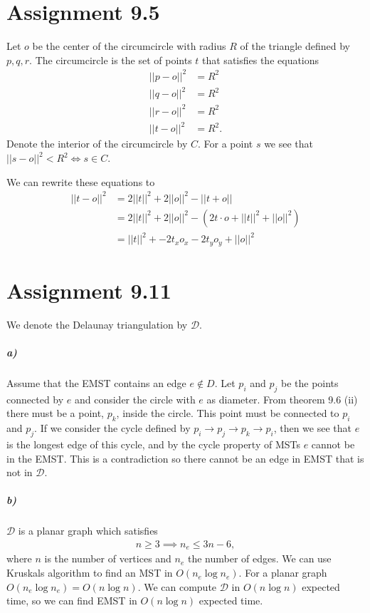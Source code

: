 \documentclass[10pt,a4paper,final,oneside,openany,article,oldfontcommands]{memoir}
\newcommand{\D}{\mathcal{D}}
\begin{document}
\chapter*{Assignment 9.5}
Let $o$ be the center of the circumcircle with radius $R$ of the triangle
defined by $p, q, r$. The circumcircle is the set of points $t$ that satisfies
the equations
\begin{align*}
  ||p - o||^2 &= R^2\\
  ||q - o||^2 &= R^2\\
  ||r - o||^2 &= R^2\\
  ||t - o||^2 &= R^2.
\end{align*}
Denote the interior of the circumcircle by $C$. For a point $s$ we see that
$||s - o||^2 < R^2 \iff s \in C$.

We can rewrite these equations to
\begin{align*}
  ||t - o||^2 &= 2||t||^2 + 2||o||^2 - ||t + o||\\
  &= 2||t||^2 + 2||o||^2 - (2 t \cdot o + ||t||^2 + ||o||^2)\\
  &= ||t||^2 +  -2t_xo_x - 2t_yo_y  + ||o||^2
\end{align*}


\chapter*{Assignment 9.11}
We denote the Delaunay triangulation by $\D$.
\paragraph{a)}
Assume that the EMST contains an edge $e \notin D$. Let $p_i$ and $p_j$ be the
points connected by $e$ and consider the circle with $e$ as diameter. From
theorem 9.6 (ii) there must be a point, $p_k$, inside the circle. This point
must be connected to $p_i$ and $p_j$. If we consider the cycle defined by $p_i
\to p_j \to p_k \to p_i$, then we see that $e$ is the longest edge of this
cycle, and by the cycle property of MSTs $e$ cannot be in the EMST. This is a
contradiction so there cannot be an edge in EMST that is not in $\D$.


\paragraph{b)}
$\D$ is a planar graph which satisfies
\begin{align*}
  n \ge 3 \implies n_e \le 3n - 6,
\end{align*}
where $n$ is the number of vertices and $n_e$ the number of edges. We can use
Kruskals algorithm to find an MST in $O(n_e \log n_e)$. For a planar graph
$O(n_e \log n_e) = O(n \log n)$. We can compute $\D$ in $O(n \log n)$ expected
time, so we can find EMST in $O(n \log n)$ expected time.

\printbibliography
\end{document}
